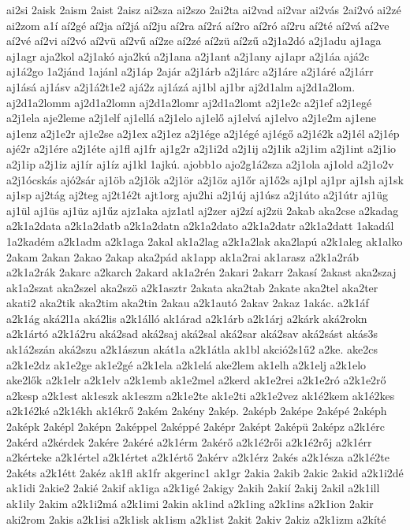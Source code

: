 {ai2si
2aisk
2aism
2aist
2aisz
ai2sza
ai2szo
2ai2ta
ai2vad
ai2var
ai2vás
2ai2vó
ai2zé
ai2zom
a1í
aí2gé
aí2ja
aí2já
aí2ju
aí2ra
aí2rá
aí2ro
aí2ró
aí2ru
aí2té
aí2vá
aí2ve
aí2vé
aí2vi
aí2vó
aí2vü
aí2vű
aí2ze
aí2zé
aí2zü
aí2zű
a2j1a2dó
a2j1adu
aj1aga
aj1agr
aja2kol
a2j1akó
aja2kú
a2j1ana
a2j1ant
a2j1any
aj1apr
a2j1áa
ajá2c
aj1á2go
1a2jánd
1ajánl
a2j1áp
2ajár
a2j1árb
a2j1árc
a2j1áre
a2j1áré
a2j1árr
aj1ásá
aj1ásv
a2j1á2t1e2
ajá2z
aj1ázá
aj1bl
aj1br
aj2d1alm
aj2d1a2lom.
aj2d1a2lomm
aj2d1a2lomn
aj2d1a2lomr
aj2d1a2lomt
a2j1e2c
a2j1ef
a2j1egé
a2j1ela
aje2leme
a2j1elf
aj1ellá
a2j1elo
aj1elő
aj1elvá
aj1elvo
a2j1e2m
aj1ene
aj1enz
a2j1e2r
aj1e2se
a2j1ex
a2j1ez
a2j1ége
a2j1égé
aj1égő
a2j1é2k
a2j1él
a2j1ép
ajé2r
a2j1ére
a2j1éte
aj1fl
aj1fr
aj1g2r
a2j1i2d
a2j1ij
a2j1ik
a2j1im
a2j1int
a2j1io
a2j1ip
a2j1iz
aj1ír
aj1íz
aj1kl
1ajkú.
ajobb1o
ajo2g1á2sza
a2j1ola
aj1old
a2j1o2v
a2j1ócskás
ajó2sár
aj1öb
a2j1ök
a2j1ör
a2j1öz
aj1őr
aj1ő2s
aj1pl
aj1pr
aj1sh
aj1sk
aj1sp
aj2tág
aj2teg
aj2t1é2t
ajt1org
aju2hi
a2j1új
aj1úsz
a2j1úto
a2j1útr
aj1üg
aj1ül
aj1üs
aj1üz
aj1űz
ajz1aka
ajz1atl
aj2zer
aj2zí
aj2zü
2akab
aka2cse
a2kadag
a2k1a2data
a2k1a2datb
a2k1a2datn
a2k1a2dato
a2k1a2datr
a2k1a2datt
1akadál
1a2kadém
a2k1adm
a2k1aga
2akal
ak1a2lag
a2k1a2lak
aka2lapú
a2k1aleg
ak1alko
2akam
2akan
2akao
2akap
aka2pád
ak1app
ak1a2rai
ak1arasz
a2k1a2ráb
a2k1a2rák
2akarc
a2karch
2akard
ak1a2rén
2akari
2akarr
2akasí
2akast
aka2szaj
ak1a2szat
aka2szel
aka2szö
a2k1asztr
2akata
aka2tab
2akate
aka2tel
aka2ter
akati2
aka2tik
aka2tim
aka2tin
2akau
a2k1autó
2akav
2akaz
1akác.
a2k1áf
a2k1ág
aká2l1a
aká2lis
a2k1álló
ak1árad
a2k1árb
a2k1árj
a2kárk
aká2rokn
a2k1ártó
a2k1á2ru
aká2sad
aká2saj
aká2sal
aká2sar
aká2sav
aká2sást
akás3s
ak1á2szán
aká2szu
a2k1ászun
akát1a
a2k1átla
ak1bl
akció2s1ű2
a2ke.
ake2cs
a2k1e2dz
ak1e2ge
ak1e2gé
a2k1ela
a2k1elá
ake2lem
ak1elh
a2k1elj
a2k1elo
ake2lők
a2k1elr
a2k1elv
a2k1emb
ak1e2mel
a2kerd
ak1e2rei
a2k1e2ró
a2k1e2rő
a2kesp
a2k1est
ak1eszk
ak1eszm
a2k1e2te
ak1e2ti
a2k1e2vez
ak1é2kem
ak1é2kes
a2k1é2ké
a2k1ékh
ak1ékrő
2akém
2akény
2akép.
2aképb
2aképe
2aképé
2aképh
2aképk
2aképl
2aképn
2aképpel
2aképpé
2aképr
2aképt
2aképü
2aképz
a2k1érc
2akérd
a2kérdek
2akére
2akéré
a2k1érm
2akérő
a2k1é2rői
a2k1é2rőj
a2k1érr
a2kérteke
a2k1értel
a2k1értet
a2k1értő
2akérv
a2k1érz
2akés
a2k1észa
a2k1é2te
2akéts
a2k1étt
2akéz
ak1fl
ak1fr
akgerinc1
ak1gr
2akia
2akib
2akic
2akid
a2k1i2dé
ak1idi
2akie2
2akié
2akif
ak1iga
a2k1igé
2akigy
2akih
2akií
2akij
2akil
a2k1ill
ak1ily
2akim
a2k1i2má
a2k1imi
2akin
ak1ind
a2k1ing
a2k1ins
a2k1ion
2akir
aki2rom
2akis
a2k1isi
a2k1isk
ak1ism
a2k1ist
2akit
2akiv
2akiz
a2k1izm
a2kíté
}
